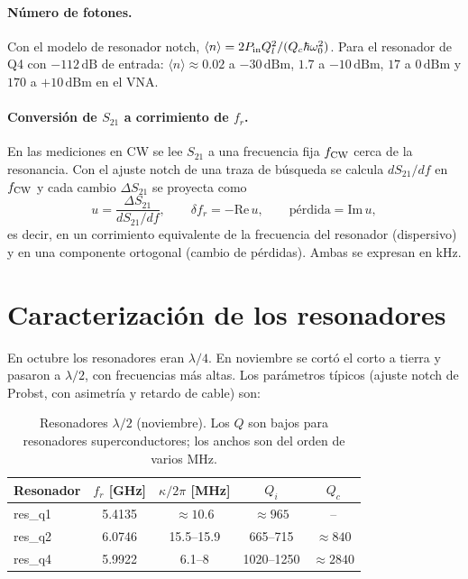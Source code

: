 \documentclass[11pt,a4paper]{article}
\newcommand{\dBm}{\,\mathrm{dBm}}
\newcommand{\dB}{\,\mathrm{dB}}
\newcommand{\fr}{f_r}
\newcommand{\dfr}{\delta\!f_r}
\begin{document}
\paragraph{Número de fotones.} Con el modelo de resonador notch, $\langle n\rangle = 2P_{\rm in}Q_l^2/(Q_c\hbar\omega_0^2)$.
Para el resonador de Q4 con $-112\dB$ de entrada: $\langle n\rangle \approx 0.02$ a $-30\dBm$, $1.7$ a $-10\dBm$,
$17$ a $0\dBm$ y $170$ a $+10\dBm$ en el VNA.

\paragraph{Conversión de $S_{21}$ a corrimiento de $\fr$.} En las mediciones en CW se lee $S_{21}$ a una frecuencia fija
$f_{\rm CW}$ cerca de la resonancia. Con el ajuste notch de una traza de búsqueda se calcula $dS_{21}/df$ en
$f_{\rm CW}$ y cada cambio $\Delta S_{21}$ se proyecta como
\begin{equation}
  u = \frac{\Delta S_{21}}{dS_{21}/df}, \qquad \dfr = -\mathrm{Re}\,u, \qquad \text{pérdida} = \mathrm{Im}\,u,
\end{equation}
es decir, en un corrimiento equivalente de la frecuencia del resonador (dispersivo) y en una componente ortogonal
(cambio de pérdidas). Ambas se expresan en kHz.

\section{Caracterización de los resonadores}

En octubre los resonadores eran $\lambda/4$. En noviembre se cortó el corto a tierra y pasaron a $\lambda/2$, con
frecuencias más altas. Los parámetros típicos (ajuste notch de Probst, con asimetría y retardo de cable) son:

\begin{table}[H]
\centering
\begin{tabular}{lcccc}
\toprule
Resonador & $\fr$ [GHz] & $\kappa/2\pi$ [MHz] & $Q_i$ & $Q_c$ \\
\midrule
res\_q1 & 5.4135 & $\approx 10.6$ & $\approx 965$ & -- \\
res\_q2 & 6.0746 & 15.5--15.9 & 665--715 & $\approx 840$ \\
res\_q4 & 5.9922 & 6.1--8 & 1020--1250 & $\approx 2840$ \\
\bottomrule
\end{tabular}
\caption{Resonadores $\lambda/2$ (noviembre). Los $Q$ son bajos para resonadores superconductores; los anchos son
del orden de varios MHz.}
\end{table}
\end{document}
